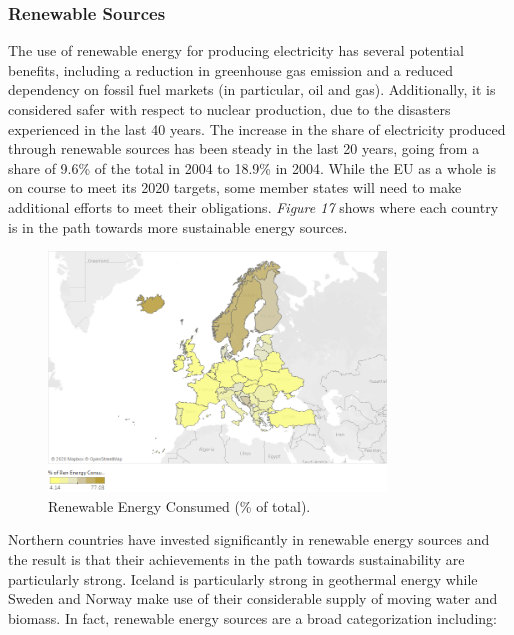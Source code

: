 \documentclass{book}
\begin{document}
\subsubsection*{Renewable Sources}

The use of renewable energy for producing electricity has several potential benefits, including a reduction in greenhouse gas emission and a reduced dependency on fossil fuel markets (in particular, oil and gas). Additionally, it is considered safer with respect to nuclear production, due to the disasters experienced in the last 40 years. The increase in the share of electricity produced through renewable sources has been steady in the last 20 years, going from a share of 9.6\% of the total in 2004 to 18.9\% in 2004. While the EU as a whole is on course to meet its 2020 targets, some member states will need to make additional efforts to meet their obligations.
\textit{Figure 17} shows where each country is in the path towards more sustainable energy sources.

\bigskip
\begin{figure}[H]
\begin{center}
\captionsetup{justification=centering}
\includegraphics[width=0.8\textwidth]{Images/ren.png}
\caption{Renewable Energy Consumed (\% of total). }
\end{center}
\end{figure}
\bigskip

Northern countries have invested significantly in renewable energy sources and the result is that their achievements in the path towards sustainability are particularly strong. Iceland is particularly strong in geothermal energy while Sweden and Norway make use of their considerable supply of moving water and biomass. In fact, renewable energy sources are a broad categorization including:
\end{document}

